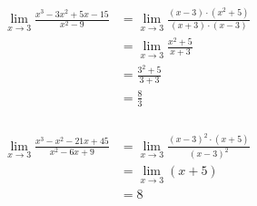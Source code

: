 \documentclass[12pt]{article}
\begin{document}
\subsubsection{}
\begin{align*}
	\lim_{x\rightarrow 3} \frac{x^3 - 3x^2 + 5x - 15}{x^2 - 9} &= \lim_{x\rightarrow 3} \frac{(x - 3)\cdot(x^2 + 5)}{(x+3)\cdot(x-3)} \\
	&= \lim_{x\rightarrow 3} \frac{x^2 + 5}{x + 3} \\
	&= \frac{3^2 + 5}{3+3} \\
	&= \frac{8}{3}
\end{align*}
\subsubsection{}
\begin{align*}
	\lim_{x\rightarrow 3} \frac{x^3 - x^2 - 21x + 45}{x^2 - 6x + 9} &= \lim_{x\rightarrow 3} \frac{{(x-3)}^2\cdot(x+5)}{{(x-3)}^2} \\
	&= \lim_{x\rightarrow 3} (x+5) \\
	&= 8
\end{align*}
\end{document}

